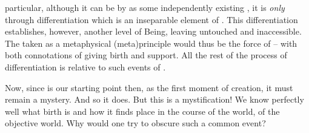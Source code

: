 particular, although it can be  by  as some
 independently existing , it is  {\em only} through
differentiation which is an 
inseparable element of .  This differentiation
establishes, however, another level of Being, leaving  untouched and
inaccessible.  The  
 taken as a metaphysical (meta)principle would thus be the force of
  -- with both connotations of giving birth and
support. All the rest of the process of differentiation is relative to such
events of .






\pa Now, since  is our starting point then, as the first moment of
creation, it must remain a mystery. And so it does. But this is a mystification!
We know perfectly well what birth is and how it finds place in the course of the
world, of the objective world. Why would one try to obscure such a common event?

